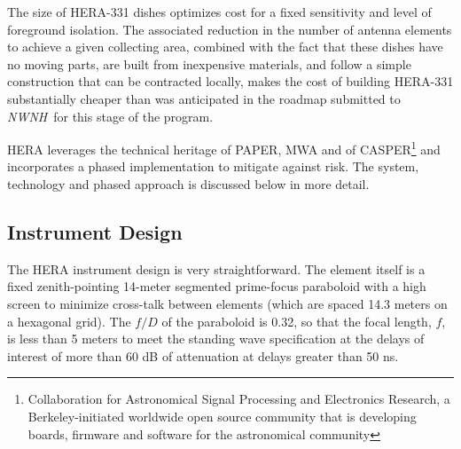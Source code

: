 \documentclass[preprint]{aastex}
\def\nwnh{{\sl NWNH}}
\begin{document}

The size of HERA-331 dishes optimizes cost for a fixed sensitivity and
level of foreground isolation.  The associated reduction in the number
of antenna elements to achieve a given collecting area, combined with
the fact that these dishes have no moving parts, are built from
inexpensive materials, and follow a simple construction that can be
contracted locally, makes the cost of building HERA-331 substantially
cheaper than was anticipated in the roadmap submitted to \nwnh\ for this
stage of the program.   

HERA leverages the technical heritage of PAPER, MWA and of CASPER\footnote{Collaboration for Astronomical
Signal Processing and Electronics Research, a Berkeley-initiated worldwide open source community that is
developing boards, firmware and software for the astronomical community} and incorporates a
phased implementation to mitigate against risk.  The system, technology and phased approach is discussed below
in more detail.

\vspace{-0.25in}
\subsection{Instrument Design}
\vspace{-6pt}
\label{InstDes}
The HERA instrument design is very straightforward.  The element
itself is a fixed zenith-pointing 14-meter segmented prime-focus paraboloid with a high screen
to minimize cross-talk between elements (which are spaced 14.3 meters on a
hexagonal grid).   The $f/D$ of
the paraboloid is 0.32, so that the focal length, $f$, is less than 5 meters to meet the 
standing wave specification at the delays of interest of more than 60 dB of attenuation at delays 
greater than 50 ns.
\end{document}
